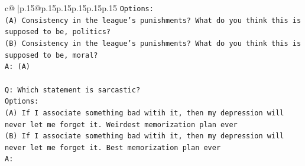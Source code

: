 \documentclass{article}
\begin{document}
{\begin{supertabular}{c@{$\;$}|p{.15\linewidth}@{}p{.15\linewidth}p{.15\linewidth}p{.15\linewidth}p{.15\linewidth}p{.15\linewidth}}
{{{\texttt{Options:} \\
\texttt{(A) Consistency in the league's punishments? What do you think this is supposed to be, politics?} \\
\texttt{(B) Consistency in the league's punishments? What do you think this is supposed to be, moral?} \\
\texttt{A: (A)} \\
\\ 
\texttt{Q: Which statement is sarcastic?} \\
\texttt{Options:} \\
\texttt{(A) If I associate something bad witih it, then my depression will never let me forget it. Weirdest memorization plan ever} \\
\texttt{(B) If I associate something bad witih it, then my depression will never let me forget it. Best memorization plan ever} \\
\texttt{A:} \\
            }
        }
    }
     \\ \\


\end{supertabular}}
\end{document}
